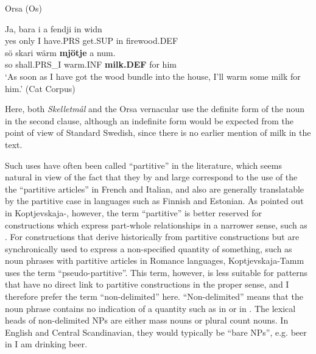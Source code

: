Orsa (Os)



 \ea\label{}
\gll Ja,  bara  i  a  fendji  in  widn\\


yes  only  I  have.PRS  get.SUP  in  firewood.DEF\\

 \ea\label{}
\gll sö  skari  wärm  \textbf{mjötje} a  num.\\


so  shall.PRS\_I  warm.INF  \textbf{milk.DEF} for  him\\

\glt ‘As soon as I have got the wood bundle into the house, I’ll warm some milk for him.’ (Cat Corpus)

\z

Here, both \textit{Skelletmål} and the Orsa vernacular use the definite form of the noun  in the second clause, although an indefinite form would be expected from the point of view of Standard Swedish, since there is no earlier mention of milk in the text. 


Such uses have often been called “partitive” in the literature, which seems natural in view of the fact that they by and large correspond to the use of the the “partitive articles” in French and Italian, and also are generally translatable by the partitive case in languages such as Finnish and Estonian. As pointed out in Koptjevskaja-\citet[525]{Tamm2001}, however, the term “partitive” is better reserved for constructions which express part-whole relationships in a narrower sense, such as . For constructions that derive historically from partitive constructions but are synchronically used to express a non-specified quantity of something, such as noun phrases with partitive articles in Romance languages, Koptjevskaja-Tamm uses the term “pseudo-partitive”. This term, however, is less suitable for patterns that have no direct link to partitive constructions in the proper sense, and I therefore prefer the term “non-delimited” here. “Non-delimited” means that the noun phrase contains no indication of a quantity such as  in or  in . The lexical heads of non-delimited NPs are either mass nouns or plural count nouns. In English and Central Scandinavian, they would typically be “bare NPs”, e.g. beer in I am drinking beer. 

